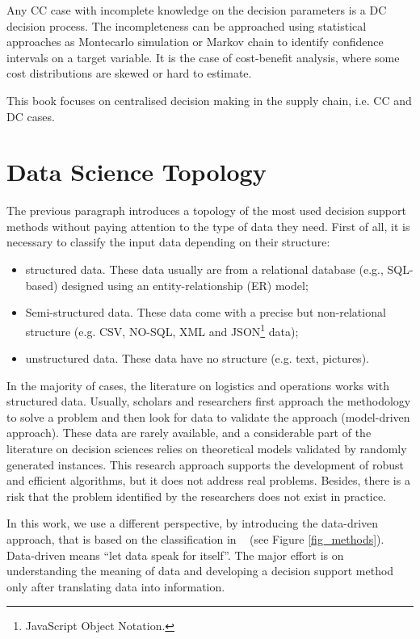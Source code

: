 Any CC case with incomplete knowledge on the decision parameters is a DC decision process. The incompleteness can be approached using statistical approaches as Montecarlo simulation or Markov chain to identify confidence intervals on a target variable. It is the case of cost-benefit analysis, where some cost distributions are skewed or hard to estimate.

This book focuses on centralised decision making in the supply chain, i.e. CC and DC cases.


\section{Data Science Topology} \label{secDataScienceTopology}

The previous paragraph introduces a topology of the most used decision support methods without paying attention to the type of data they need. First of all, it is necessary to classify the input data depending on their structure:

\begin{itemize}
    \item structured data. These data usually are from a relational database (e.g., SQL-based) designed using an entity-relationship (ER) model;
    \item Semi-structured data. These data come with a precise but non-relational structure (e.g. CSV, NO-SQL, XML and JSON\footnote{JavaScript Object Notation.} data);
    \item unstructured data. These data have no structure (e.g. text, pictures).
\end{itemize}

In the majority of cases, the literature on logistics and operations works with structured data. Usually, scholars and researchers first approach the methodology to solve a problem and then look for data to validate the approach (model-driven approach). These data are rarely available, and a considerable part of the literature on decision sciences relies on theoretical models validated by randomly generated instances. This research approach supports the development of robust and efficient algorithms, but it does not address real problems. Besides, there is a risk that the problem identified by the researchers does not exist in practice.\par

In this work, we use a different perspective, by introducing the data-driven approach, that is based on the classification in ~\cite{Irv2010} (see Figure \ref{fig_methods}). Data-driven means “let data speak for itself”. The major effort is on understanding the meaning of data and developing a decision support method only after translating data into information.

